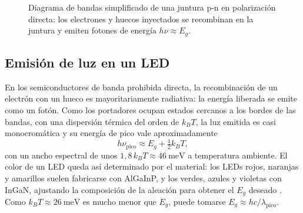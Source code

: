 \documentclass{article}
\begin{document}
\begin{figure}[H]
\centering
{}
\caption{Diagrama de bandas simplificado de una juntura p-n en polarización directa: los electrones y huecos inyectados se recombinan en la juntura y emiten fotones de energía $h\nu\approx E_g$.}
\label{fig:bandas}
\end{figure}

\subsection{Emisión de luz en un LED}

En los semiconductores de banda prohibida directa, la recombinación de un electrón con un hueco es mayoritariamente radiativa: la energía liberada se emite como un fotón. Como los portadores ocupan estados cercanos a los bordes de las bandas, con una dispersión térmica del orden de $k_BT$, la luz emitida es casi monocromática y su energía de pico vale aproximadamente \cite{schubert}
\begin{equation}
    h\nu_{\mathrm{pico}}\approx E_g+\tfrac{1}{2}k_BT,
    \label{eq:pico}
\end{equation}
con un ancho espectral de unos $1,8\,k_BT\approx46\ \mathrm{meV}$ a temperatura ambiente. El color de un LED queda así determinado por el material: los LEDs rojos, naranjas y amarillos suelen fabricarse con AlGaInP, y los verdes, azules y violetas con InGaN, ajustando la composición de la aleación para obtener el $E_g$ deseado \cite{schubert}. Como $k_BT\approx26\ \mathrm{meV}$ es mucho menor que $E_g$, puede tomarse $E_g\approx hc/\lambda_{\mathrm{pico}}$.
\end{document}
